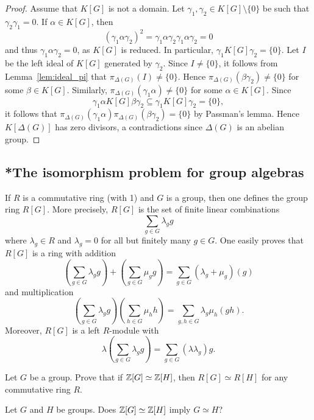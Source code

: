 \begin{proof}
	Assume that $K[G]$ is not a domain. Let $\gamma_1,\gamma_2\in K[G]\setminus\{0\}$
	be such that $\gamma_2\gamma_1=0$. If $\alpha\in K[G]$, then
	\[
		(\gamma_1\alpha\gamma_2)^2=\gamma_1\alpha\gamma_2\gamma_1\alpha\gamma_2=0
	\]
	and thus $\gamma_1\alpha\gamma_2=0$, as $K[G]$ is reduced. In particular, 
	$\gamma_1K[G]\gamma_2=\{0\}$. Let $I$ be the left ideal of $K[G]$ generated 
	by $\gamma_2$. Since $I\ne\{0\}$, it follows
	from Lemma~\ref{lem:ideal_pi} that 
	$\pi_{\Delta(G)}(I)\ne\{0\}$. Hence 
	$\pi_{\Delta(G)}(\beta\gamma_2)\ne\{ 0\}$ for some $\beta\in K[G]$. 
	Similarly, 
	$\pi_{\Delta(G)}(\gamma_1\alpha)\ne\{ 0\}$ for some $\alpha\in K[G]$. Since 
	\[
		\gamma_1\alpha K[G]\beta\gamma_2\subseteq \gamma_1 K[G]\gamma_2=\{0\},
	\]
    it follows that $\pi_{\Delta(G)}(\gamma_1\alpha)\pi_{\Delta(G)}(\beta\gamma_2)=\{0\}$
    by Passman's lemma. Hence $K[\Delta(G)]$ has zero divisors, a contradictions
    since $\Delta(G)$ is an abelian group.
\end{proof}



\subsection{*The isomorphism problem for group algebras}

If $R$ is a commutative ring (with 1) 
and $G$ is a group, then one defines the group ring $R[G]$. More precisely,
$R[G]$ is the set of finite linear combinations
\[
    \sum_{g\in G}\lambda_gg
\]
where $\lambda_g\in R$ and $\lambda_g=0$ for all but finitely many $g\in G$. 
One easily proves that $R[G]$ is a ring with 
addition
\[
\left(\sum_{g\in G}\lambda_gg\right)+\left(\sum_{g\in G}\mu_gg\right)
=\sum_{g\in G}(\lambda_g+\mu_g)(g)
\]
and multiplication 
\[
\left(\sum_{g\in G}\lambda_gg\right)\left(\sum_{h\in G}\mu_hh\right)
=\sum_{g,h\in G}\lambda_g\mu_h(gh).
\]
Moreover, $R[G]$ is a left $R$-module with
\[
\lambda(\sum_{g\in G}\lambda_gg)=\sum_{g\in G}(\lambda\lambda_g)g.
\]

\begin{exercise}
    Let $G$ be a group. Prove that if 
    $\mathbb{Z}[G]\simeq\mathbb{Z}[H]$, then $R[G]\simeq R[H]$ for any commutative ring $R$.      
\end{exercise}

\begin{question}
\label{question:IP}
    Let $G$ and $H$ be groups. Does $\mathbb{Z}[G]\simeq\mathbb{Z}[H]$ imply $G\simeq H$?
\end{question}   

